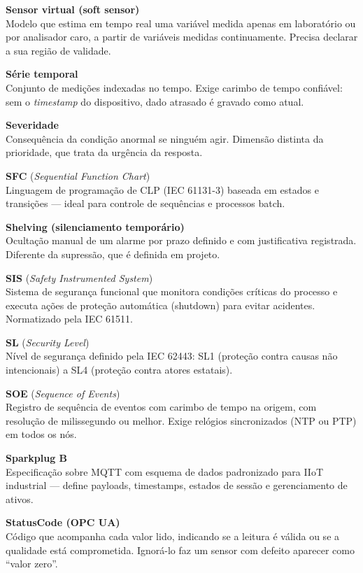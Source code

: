 \textbf{Sensor virtual (soft sensor)}\\
Modelo que estima em tempo real uma variável medida apenas em laboratório ou por analisador caro, a partir de variáveis medidas continuamente. Precisa declarar a sua região de validade.

\textbf{Série temporal}\\
Conjunto de medições indexadas no tempo. Exige carimbo de tempo confiável: sem o \emph{timestamp} do dispositivo, dado atrasado é gravado como atual.

\textbf{Severidade}\\
Consequência da condição anormal se ninguém agir. Dimensão distinta da prioridade, que trata da urgência da resposta.

\textbf{SFC} (\emph{Sequential Function Chart})\\
Linguagem de programação de CLP (IEC 61131-3) baseada em estados e transições --- ideal para controle de sequências e processos batch.

\textbf{Shelving (silenciamento temporário)}\\
Ocultação manual de um alarme por prazo definido e com justificativa registrada. Diferente da supressão, que é definida em projeto.

\textbf{SIS} (\emph{Safety Instrumented System})\\
Sistema de segurança funcional que monitora condições críticas do processo e executa ações de proteção automática (shutdown) para evitar acidentes. Normatizado pela IEC 61511.

\textbf{SL} (\emph{Security Level})\\
Nível de segurança definido pela IEC 62443: SL1 (proteção contra causas não intencionais) a SL4 (proteção contra atores estatais).

\textbf{SOE} (\emph{Sequence of Events})\\
Registro de sequência de eventos com carimbo de tempo na origem, com resolução de milissegundo ou melhor. Exige relógios sincronizados (NTP ou PTP) em todos os nós.

\textbf{Sparkplug B}\\
Especificação sobre MQTT com esquema de dados padronizado para IIoT industrial --- define payloads, timestamps, estados de sessão e gerenciamento de ativos.

\textbf{StatusCode (OPC UA)}\\
Código que acompanha cada valor lido, indicando se a leitura é válida ou se a qualidade está comprometida. Ignorá-lo faz um sensor com defeito aparecer como ``valor zero''.

